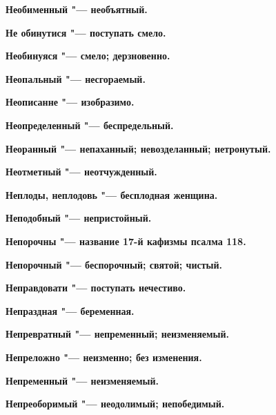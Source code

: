 \begin{mymulticols}{2}
\bfseries Необименный\normalfont{} "--- необъятный. 




\bfseries Не обинутися\normalfont{} "--- поступать смело. 




\bfseries Необинуяся\normalfont{} "--- смело; дерзновенно. 




\bfseries Неопальный\normalfont{} "--- несгораемый. 




\bfseries Неописанне\normalfont{} "--- изобразимо. 




\bfseries Неопределенный\normalfont{} "--- беспредельный. 




\bfseries Неоранный\normalfont{} "--- непаханный; невозделанный; нетронутый. 




\bfseries Неотметный\normalfont{} "--- неотчужденный. 




\bfseries Неплоды, неплодовь\normalfont{} "--- бесплодная женщина. 




\bfseries Неподобный\normalfont{} "--- непристойный. 




\bfseries Непорочны\normalfont{} "--- название 17-й кафизмы псалма 118. 




\bfseries Непорочный\normalfont{} "--- беспорочный; святой; чистый. 




\bfseries Неправдовати\normalfont{} "--- поступать нечестиво. 




\bfseries Непраздная\normalfont{} "--- беременная. 




\bfseries Непревратный\normalfont{} "--- непременный; неизменяемый. 




\bfseries Непреложно\normalfont{} "--- неизменно; без изменения. 




\bfseries Непременный\normalfont{} "--- неизменяемый. 




\bfseries Непреоборимый\normalfont{} "--- неодолимый; непобедимый. 





\end{mymulticols}
